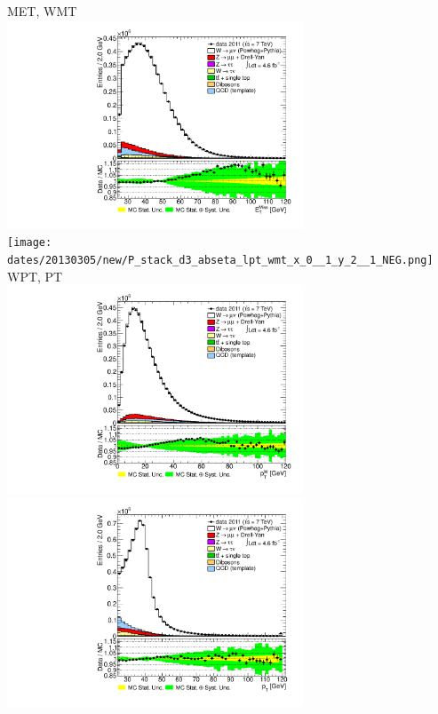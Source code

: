  {
\colb[T]

MET, WMT \\
\centering
\includegraphics[width=0.66\textwidth]{dates/20130305/new/P_stack_d3_abseta_lpt_met_x_0__1_y_2__1_NEG.pdf} \\
\texttt{[image: dates/20130305/new/P\_stack\_d3\_abseta\_lpt\_wmt\_x\_0\_\_1\_y\_2\_\_1\_NEG.png]}
WPT, PT \\
\centering
\includegraphics[width=0.66\textwidth]{dates/20130305/new/P_stack_d3_abseta_lpt_wpt_x_0__1_y_2__1_NEG} \\
\includegraphics[width=0.66\textwidth]{dates/20130305/new/P_stack_lpt_NEG} 
\cole
}


